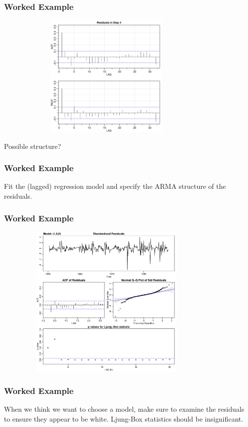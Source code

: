\documentclass[%
xcolor=pdftex]{beamer}
\begin{document}
\begin{frame}
\frametitle{Worked Example}

\includegraphics[width=110mm, height=60mm]{residuals_soi.pdf}

Possible structure?

\end{frame}

\begin{frame}
\frametitle{Worked Example}

Fit the (lagged) regression model and specify the ARMA structure of the residuals.

\end{frame}

\begin{frame}
\frametitle{Worked Example}

\includegraphics[width=110mm, height=75mm]{diag1.pdf}

\end{frame}

\begin{frame}
\frametitle{Worked Example}

When we think we want to choose a model, make sure to examine the residuals to ensure they appear to be white. Ljung-Box statistics should be insignificant.

\end{frame}
\end{document}
